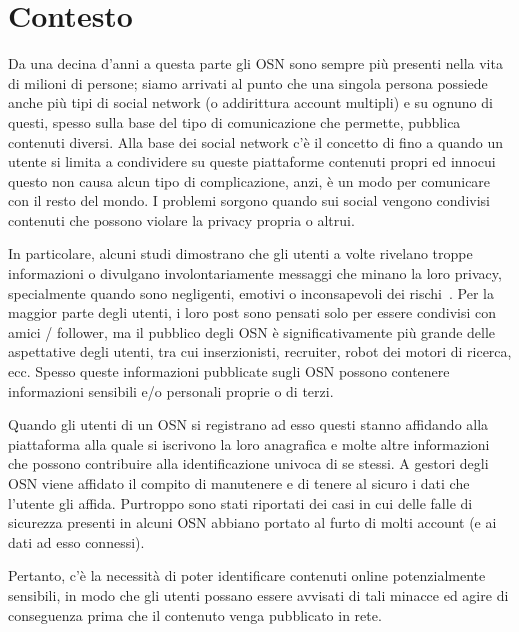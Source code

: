 \section{Contesto}
Da una decina d'anni a questa parte gli OSN sono sempre più presenti nella vita di milioni di persone; siamo arrivati al punto che una singola persona possiede anche più tipi di social network (o addirittura account multipli) e su ognuno di questi, spesso sulla base del tipo di comunicazione che permette, pubblica contenuti diversi. Alla base dei social network c'è il concetto di  fino a quando un utente si limita a condividere su queste piattaforme contenuti propri ed innocui questo non causa alcun tipo di complicazione, anzi, è un modo per comunicare con il resto del mondo. I problemi sorgono quando sui social vengono condivisi contenuti che possono violare la privacy propria o altrui. 

In particolare, alcuni studi dimostrano che gli utenti a volte rivelano troppe informazioni o divulgano involontariamente messaggi che minano la loro privacy, specialmente quando sono negligenti, emotivi o inconsapevoli dei rischi~\cite{looseTweets, studyFb, readMyTwitter}.
Per la maggior parte degli utenti, i loro post sono pensati solo per essere condivisi con amici / follower, ma il pubblico degli OSN è significativamente più grande delle aspettative degli utenti, tra cui inserzionisti, recruiter, robot dei motori di ricerca, ecc.
Spesso queste informazioni pubblicate sugli OSN possono contenere informazioni sensibili e/o personali proprie o di terzi. 

Quando gli utenti di un OSN si registrano ad esso questi stanno affidando alla piattaforma alla quale si iscrivono la loro anagrafica e molte altre informazioni che possono contribuire alla identificazione univoca di se stessi. A gestori degli OSN viene affidato il compito di manutenere e di tenere al sicuro i dati che l'utente gli affida. Purtroppo sono stati riportati dei casi in cui delle falle di sicurezza presenti in alcuni OSN abbiano portato al furto di molti account (e ai dati ad esso connessi).

Pertanto, c'è la necessità di poter identificare contenuti online potenzialmente sensibili, in modo che gli utenti possano essere avvisati di tali minacce ed agire di conseguenza prima che il contenuto venga pubblicato in rete.




